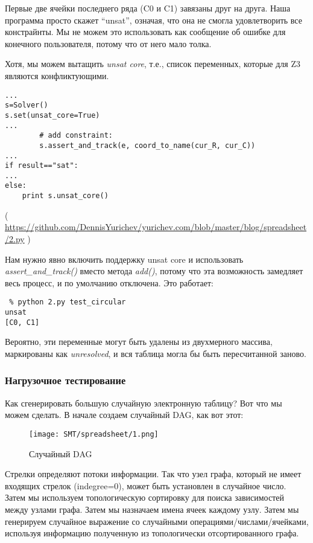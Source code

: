 Первые две ячейки последнего ряда (C0 и C1) завязаны друг на друга.
Наша программа просто скажет ``unsat'', означая, что она не смогла удовлетворить все констрайнты.
Мы не можем это использовать как сообщение об ошибке для конечного пользователя, потому что от него мало толка.

Хотя, мы можем вытащить \textit{unsat core}, т.е., список переменных, которые для Z3 являются конфликтующими.

\begin{lstlisting}
...
s=Solver()
s.set(unsat_core=True)
...
        # add constraint:
        s.assert_and_track(e, coord_to_name(cur_R, cur_C))
...
if result=="sat":
...
else:
    print s.unsat_core()
\end{lstlisting}

( \url{https://github.com/DennisYurichev/yurichev.com/blob/master/blog/spreadsheet/2.py} )

Нам нужно явно включить поддержку unsat core и использовать \textit{assert\_and\_track()} вместо метода \textit{add()},
потому что эта возможность замедляет весь процесс, и по умолчанию отключена.
Это работает:

\begin{lstlisting}
 % python 2.py test_circular
unsat
[C0, C1]
\end{lstlisting}

Вероятно, эти переменные могут быть удалены из двухмерного массива, маркированы как \textit{unresolved},
и вся таблица могла бы быть пересчитанной заново.

\subsubsection{Нагрузочное тестирование}

Как сгенерировать большую случайную электронную таблицу?
Вот что мы можем сделать.
В начале создаем случайный \ac{DAG}, как вот этот:

\begin{figure}[H]
\centering
\texttt{[image: SMT/spreadsheet/1.png]}
\caption{Случайный DAG}
\end{figure}

Стрелки определяют потоки информации.
Так что узел графа, который не имеет входящих стрелок (indegree=0), может быть установлен в случайное число.
Затем мы используем топологическую сортировку для поиска зависимостей между узлами графа.
Затем мы назначаем имена ячеек каждому узлу.
Затем мы генерируем случайное выражение со случайными операциями/числами/ячейками, используя информацию
полученную из топологически отсортированного графа.

